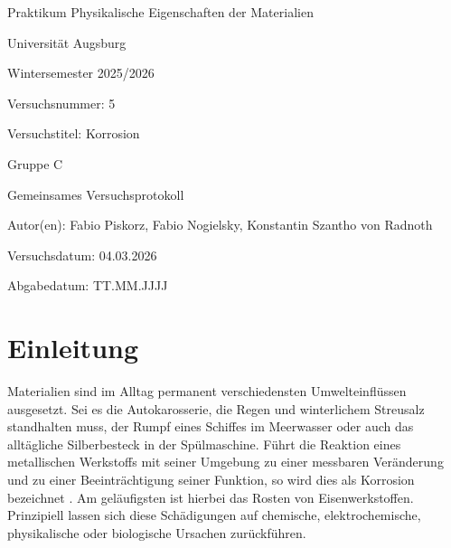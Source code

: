 \documentclass[11pt,a4paper]{article}
\numberwithin{equation}{section}
\newcommand{\Lehrveranstaltung}{Praktikum Physikalische Eigenschaften der Materialien}
\newcommand{\Universitaet}{Universität Augsburg}
\newcommand{\Semester}{Wintersemester 2025/2026}
\newcommand{\Versuchsnummer}{5}
\newcommand{\Versuchstitel}{Korrosion}
\newcommand{\Gruppe}{C}
\newcommand{\Versuchsdatum}{04.03.2026}
\newcommand{\Abgabedatum}{TT.MM.JJJJ}
\newcommand{\Abgabeart}{Gemeinsames Versuchsprotokoll}
\newcommand{\Autor}{Fabio Piskorz, Fabio Nogielsky, Konstantin Szantho von Radnoth }
\begin{document}

\begin{titlepage}
    \centering
    {\Large \Lehrveranstaltung\par}
    \vspace{0.5cm}
    {\large \Universitaet\par}
    \vspace{0.5cm}
    {\large \Semester\par}
    \vspace{1.5cm}
    {\Large Versuchsnummer: \Versuchsnummer\par}
    \vspace{0.5cm}
    {\Large Versuchstitel: \Versuchstitel\par}
    \vspace{1.5cm}
    {\large Gruppe \Gruppe\par}
    \vspace{0.5cm}
    {\LARGE \Abgabeart\par}
    \vspace{0.5cm}
    {\large Autor(en): \Autor\par}
    \vspace{1.5cm}
    {\large Versuchsdatum: \Versuchsdatum\par}
    \vspace{0.5cm}
    {\large Abgabedatum: \Abgabedatum\par}

    \vfill
\end{titlepage}


\tableofcontents
\newpage

\section{Einleitung}

Materialien sind im Alltag permanent verschiedensten Umwelteinflüssen ausgesetzt. Sei es die Autokarosserie, die Regen und winterlichem Streusalz standhalten muss, der Rumpf eines Schiffes im Meerwasser oder auch das alltägliche Silberbesteck in der Spülmaschine. Führt die Reaktion eines metallischen Werkstoffs mit seiner Umgebung zu einer messbaren Veränderung und zu einer Beeinträchtigung seiner Funktion, so wird dies als Korrosion bezeichnet \cite{korrosioDef}. Am geläufigsten ist hierbei das Rosten von Eisenwerkstoffen. Prinzipiell lassen sich diese Schädigungen auf chemische, elektrochemische, physikalische oder biologische Ursachen zurückführen.
\end{document}
